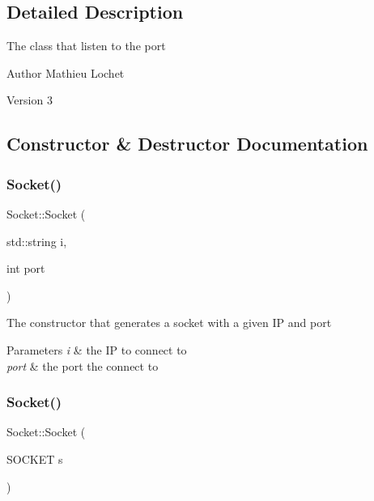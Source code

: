 \subsection{Detailed Description}
The class that listen to the port

\begin{DoxyAuthor}{Author}
Mathieu Lochet 
\end{DoxyAuthor}
\begin{DoxyVersion}{Version}
3 
\end{DoxyVersion}


\subsection{Constructor \& Destructor Documentation}
\mbox{\label{classSocket_a4c7a40e6c1513edf63e53b74b4f32b80}} 
\subsubsection{\texorpdfstring{Socket()}{Socket()}\hspace{0.1cm}{\footnotesize\ttfamily [1/2]}}
{\footnotesize\ttfamily Socket\+::\+Socket (\begin{DoxyParamCaption}\item[{std\+::string}]{i,  }\item[{int}]{port }\end{DoxyParamCaption})}

The constructor that generates a socket with a given IP and port


\begin{DoxyParams}{Parameters}
{\em i} & the IP to connect to \\
\hline
{\em port} & the port the connect to \\
\hline
\end{DoxyParams}
\mbox{\label{classSocket_a7e2193bd6a9b6846f90eaf4786cfc41b}} 
\subsubsection{\texorpdfstring{Socket()}{Socket()}\hspace{0.1cm}{\footnotesize\ttfamily [2/2]}}
{\footnotesize\ttfamily Socket\+::\+Socket (\begin{DoxyParamCaption}\item[{S\+O\+C\+K\+ET}]{s }\end{DoxyParamCaption})\hspace{0.3cm}{\ttfamily [explicit]}}

